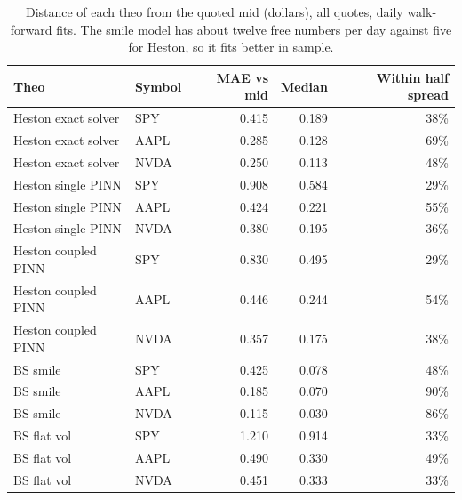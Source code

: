 \begin{table}[t]
\centering
\small
\caption{Distance of each theo from the quoted mid (dollars), all quotes, daily walk-forward fits. The smile model has about twelve free numbers per day against five for Heston, so it fits better in sample.}
\label{tab:fit}
\begin{tabular}{llrrr}
\toprule
Theo & Symbol & MAE vs mid & Median & Within half spread \\
\midrule
Heston exact solver & SPY & 0.415 & 0.189 & 38\% \\
Heston exact solver & AAPL & 0.285 & 0.128 & 69\% \\
Heston exact solver & NVDA & 0.250 & 0.113 & 48\% \\
Heston single PINN & SPY & 0.908 & 0.584 & 29\% \\
Heston single PINN & AAPL & 0.424 & 0.221 & 55\% \\
Heston single PINN & NVDA & 0.380 & 0.195 & 36\% \\
Heston coupled PINN & SPY & 0.830 & 0.495 & 29\% \\
Heston coupled PINN & AAPL & 0.446 & 0.244 & 54\% \\
Heston coupled PINN & NVDA & 0.357 & 0.175 & 38\% \\
BS smile & SPY & 0.425 & 0.078 & 48\% \\
BS smile & AAPL & 0.185 & 0.070 & 90\% \\
BS smile & NVDA & 0.115 & 0.030 & 86\% \\
BS flat vol & SPY & 1.210 & 0.914 & 33\% \\
BS flat vol & AAPL & 0.490 & 0.330 & 49\% \\
BS flat vol & NVDA & 0.451 & 0.333 & 33\% \\
\bottomrule
\end{tabular}
\end{table}
